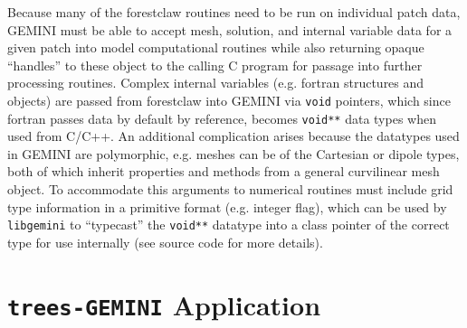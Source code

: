\documentclass[11pt,letterpaper]{article}
\begin{document}
Because many of the forestclaw routines need to be run on individual patch data, GEMINI must be able to accept mesh, solution, and internal variable data for a given patch into model computational routines while also returning opaque ``handles'' to these object to the calling C program for passage into further processing routines.  Complex internal variables (e.g. fortran structures and objects) are passed from forestclaw into GEMINI via \texttt{void} pointers, which since fortran passes data by default by reference, becomes \texttt{void**} data types when used from C/C++.  An additional complication arises because the datatypes used in GEMINI are polymorphic, e.g. meshes can be of the Cartesian or dipole types, both of which inherit properties and methods from a general curvilinear mesh object.  To accommodate this arguments to numerical routines must include grid type information in a primitive format (e.g. integer flag), which can be used by \texttt{libgemini} to ``typecast'' the \texttt{void**} datatype into a class pointer of the correct type for use internally (see source code for more details).  


\section{\texttt{trees-GEMINI} Application} \label{sec:tG}
\end{document}
